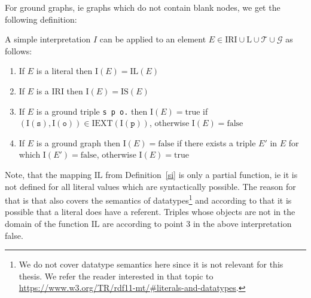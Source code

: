 % 
% 
For ground graphs, ie graphs which do not contain blank nodes, we get the following definition:
\begin{definition}
A simple interpretation $I$ can be applied to an element $E\in \mathrm{IRI}\cup\mathrm{L}\cup\mathcal{T}\cup\mathcal{G}$ as follows: 
\begin{enumerate}
 \item If $E$ is a literal then $\mathrm{I}(E)=\mathrm{IL}(E)$
 \item If $E$ is a IRI then $\mathrm{I}(E)=\mathrm{IS}(E)$
 \item If $E$ is a ground triple \texttt{s p o.} then $ \mathrm{I}(E)=\text{true}$ if $(\mathrm{I}(\texttt{s}), \mathrm{I}(\texttt{o}))\in \mathrm{IEXT}(\mathrm{I}(\texttt{p}))$, otherwise 
 $\mathrm{I}(E)=\text{false}$
 \item If $E$ is a ground graph then $\mathrm{I}(E)=\text{false}$ if there exists a triple $E'$ in $E$ for which $\mathrm{I}(E')=\text{false}$, otherwise $\mathrm{I}(E)=\text{true}$ 
 \end{enumerate}
\end{definition}
Note, that the mapping $\mathrm{IL}$ from Definition~\ref{si} is only a partial function, ie it is not defined for all literal values which are syntactically possible. 
The reason for that is that \rdf also covers the semantics of datatypes\footnote{We do not cover datatype semantics here since it is not relevant for this thesis. We refer the reader interested in that topic 
to \url{https://www.w3.org/TR/rdf11-mt/\#literals-and-datatypes}.} and according to that it is possible that a literal does have a referent. 
Triples whose objects are not in the domain of the function $\mathrm{IL}$ are according to point 3 in the above interpretation false.

